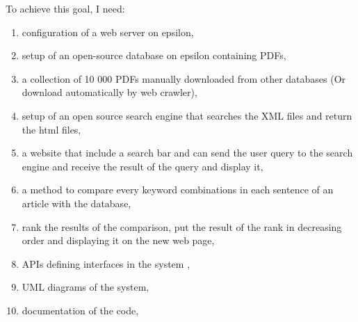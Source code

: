 

	To achieve this goal, I need:
\begin{enumerate}
  \item configuration of a web server on epsilon,
  \item setup of an open-source database on epsilon containing PDFs,
  \item a collection of 10 000 PDFs manually downloaded from other databases (Or download automatically by web crawler),
  \item setup of an open source search engine that searches the XML files and return the html files,
  \item a website that include a search bar and can send the user query to the search engine and receive the result of the query and display it,
  \item a method to compare every keyword combinations in each sentence of an article with the database,
  \item rank the results of the comparison, put the result of the rank in decreasing order and displaying it on the new web page,
  \item APIs defining interfaces in the system ,
  \item UML diagrams of the system,
  \item documentation of the code, 
\end{enumerate}
